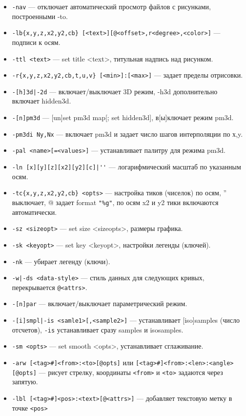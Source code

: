 \documentclass[12pt]{article}
\begin{document}
\begin{itemize}
\item \verb'-nav' --- отключает автоматический просмотр файлов с рисунками, построенными -to.                     
\item \verb'-lb{x,y,z,x2,y2,cb} [<text>][@<offset>,r<degree>,<color>]' --- подписи к осям.
\item \verb'-ttl <text>' --- set title <text>, титульная надпись над рисунком.
\item \verb'-r{x,y,z,x2,y2,cb,t,u,v} [<min>]:[<max>]' --- задает пределы отрисовки.
\item \verb'-[h]3d|-2d' --- включает/выключает 3D режим, -h3d дополнительно включает hidden3d.
\item \verb'-[n]pm3d' --- [un]set pm3d map[; set hidden3d], в[ы]ключает режим pm3d.
\item \verb'-pm3di Ny,Nx' --- включает pm3d и задает число шагов интерполяции по х,y.
\item \verb'-pal <name>[=<values>]' --- устанавливает палитру для режима pm3d.
\item \verb:-ln [x][y][z][x2][y2][c]|'': --- логарифмический масштаб по указанным осям.
\item \verb'-tc{x,y,z,x2,y2,cb} <opts>'  --- настройка тиков (чиселок) по осям, '' выключает,
             @ задает format \verb'"%g"', по осям x2 и y2 тики включаются автоматически. 
\item \verb'-sz <sizeopt>' ---  set size <sizeopts>, размеры графика. 
\item \verb'-sk <keyopt>' --- set key <keyopt>, настройки легенды (ключей).
\item \verb'-nk' --- убирает легенду (ключи). 
\item \verb'-w|-ds <data-style>'  --- стиль данных для следующих кривых, перекрывается \verb'@<attrs>'.
\item \verb'-[n]par' --- включает/выключает параметрический режим.
\item \verb'-[i]smpl|-is <samle1>[,<sample2>]' --- устанавливает [iso]samples (число отсчетов), 
  \verb'-is' устанавливает сразу samples и isosamples.
\item \verb'-sm <opts>' --- set smooth <opts>, устанавливает сглаживание.
\item \verb'-arw [<tag>#]<from>:<to>[@opts]' или \verb'[<tag>#]<from>:<len>:<angle>[@opts]' --- рисует стрелку,
  координаты \verb'<from>' и \verb'<to>' задаются через запятую.
\item \verb'-lbl [<tag>#]<pos>:<text>[@<attrs>]' --- добавляет текстовую метку в точке \verb'<pos>'

\end{itemize}
\end{document}
